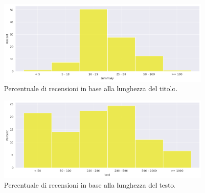\begin{figure}[ht]
    \centering
    \includegraphics[width=0.95\textwidth]{images/eda/eda_summary.png}
    \caption{Percentuale di recensioni in base alla lunghezza del titolo.}
    \label{fig:eda_summary}
\end{figure}

\begin{figure}[ht]
    \centering
    \includegraphics[width=0.95\textwidth]{images/eda/eda_text.png}
    \caption{Percentuale di recensioni in base alla lunghezza del testo.}
    \label{fig:eda_text}
\end{figure}